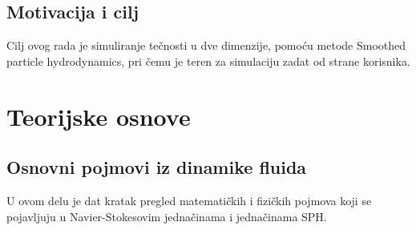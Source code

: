 \documentclass[12pt]{article}
\begin{document}
    \subsection{Motivacija i cilj}\label{motivacija}
        Cilj ovog rada je simuliranje te\v cnosti u dve dimenzije, pomo\'cu metode Smoothed particle hydrodynamics, pri \v cemu je teren za simulaciju zadat od strane korisnika.

\section{Teorijske osnove}
    \subsection{Osnovni pojmovi iz dinamike fluida}
        U ovom delu je dat kratak pregled matemati\v ckih i fizi\v ckih pojmova koji se pojavljuju u Navier-Stokesovim jedna\v cinama i jedna\v cinama SPH.
        \label{definicije}
\end{document}
